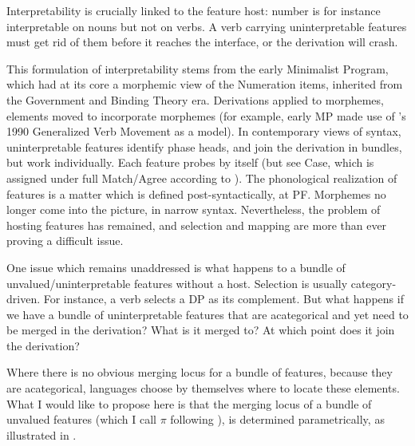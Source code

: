 \documentclass[output=paper
,modfonts
,nonflat]{langsci/langscibook}
\begin{document}
Interpretability is crucially linked to the feature host: number is for instance interpretable on nouns but not on verbs. A verb carrying uninterpretable features must get rid of them before it reaches the interface, or the derivation will crash.

This formulation of interpretability stems from the early Minimalist Program, which had at its core a morphemic view of the Numeration items, inherited from the Government and Binding Theory era. Derivations applied to morphemes, elements moved to incorporate morphemes (for example, early MP made use of \citeauthor{Belletti1990}'s 1990 Generalized Verb Movement as a model). In contemporary views of syntax, uninterpretable features identify phase heads, and join the derivation in bundles, but work individually. Each feature probes by itself (but see Case, which is assigned under full Match/Agree according to \citealt{Chomsky2000}). The phonological realization of features is a matter which is defined post-syntactically, at PF. Morphemes no longer come into the picture, in narrow syntax. Nevertheless, the problem of hosting features has remained, and selection and mapping are more than ever proving a difficult issue.\largerpage

One issue which remains unaddressed is what happens to a bundle of unvalued/uninterpretable features without a host. Selection is usually category-driven. For instance, a verb selects a DP as its complement. But what happens if we have a bundle of uninterpretable features that are acategorical and yet need to be merged in the derivation? What is it merged to? At which point does it join the derivation?

Where there is no obvious merging locus for a bundle of features, because they are acategorical, languages choose by themselves where to locate these elements. What I would like to propose here is that the merging locus of a bundle of unvalued features (which I call $\pi $ following \citealt{D`Alessandro2017}), is determined parametrically, as illustrated in .
\end{document}
